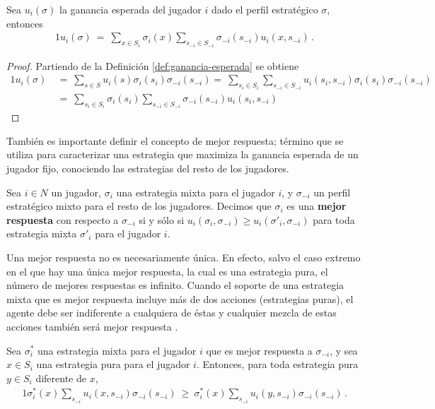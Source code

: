 \begin{lemma}
\label{lemma:1}
Sea $u_i(\sigma)$ la ganancia esperada del jugador $i$ dado el perfil estratégico $\sigma$, entonces
\begin{alignat}{1}
u_i(\sigma)\ =\ \sum_{x\in S_i} \sigma_i(x) \sum_{s_{-i}\in S_{-i}} \sigma_{-i}(s_{-i}) u_i(x,s_{-i}) \,.
\end{alignat}
\end{lemma}
\begin{proof}
Partiendo de la Definición \ref{def:ganancia-esperada} se obtiene
\begin{alignat}{1}
	u_i(\sigma)\  &=\ \sum_{s \in S} u_i(s) \sigma_i(s_i) \sigma_{-i}(s_{-i}) =\ \sum_{s_i \in S_i} \sum_{s_{-i} \in S_{-i}} u_i(s_i, s_{-i}) \sigma_i(s_i) \sigma_{-i}(s_{-i}) \\
	&=\ \sum_{s_i\in S_i} \sigma_i(s_i) \sum_{s_{-i}\in S_{-i}} \sigma_{-i}(s_{-i}) u_i(s_i,s_{-i})
\end{alignat}
\end{proof}

También es importante definir el concepto de mejor respuesta; término que se utiliza para caracterizar una estrategia que maximiza la ganancia esperada de un jugador fijo, conociendo las estrategias del resto de los jugadores.

\begin{definition}
\label{def:mejor-respuesta}
Sea $i\in N$ un jugador, $\sigma_i$ una estrategia mixta para el jugador $i$, y $\sigma_{-i}$ un perfil estratégico mixto para el resto de los jugadores. Decimos que $\sigma_i$ es una \textbf{mejor respuesta} con respecto a $\sigma_{-i}$ si y s\'olo si
$u_i(\sigma_i,\sigma_{-i}) \geq u_i(\sigma'_i,\sigma_{-i})$ para toda estrategia mixta $\sigma'_i$ para el jugador $i$.
\end{definition}

Una mejor respuesta no es necesariamente única. En efecto, salvo el caso extremo en el que hay una única mejor respuesta, la cual es una estrategia pura, el número de mejores respuestas es infinito. Cuando el soporte de una estrategia mixta que es mejor respuesta incluye más de dos acciones (estrategias puras), el agente debe ser indiferente a cualquiera de éstas y cualquier mezcla de estas acciones también será mejor respuesta \cite{bib:tutorial-existence-nash}.

\begin{lemma}
\label{lemma:2}
Sea $\sigma^*_i$ una estrategia mixta para el jugador $i$ que es mejor respuesta a $\sigma_{-i}$, y sea $x\in S_i$ una estrategia pura para el jugador $i$. Entonces, para toda estrategia pura $y\in S_i$ diferente de $x$,
\begin{alignat}{1}
  \sigma^*_i(x) \sum_{s_{-i}} u_i(x,s_{-i}) \sigma_{-i}(s_{-i})\ \geq\ \sigma^*_i(x) \sum_{s_{-i}} u_i(y,s_{-i}) \sigma_{-i}(s_{-i}) \,.
\end{alignat}
\end{lemma}

